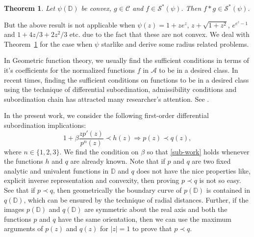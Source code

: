 \documentclass[12pt, reqno]{amsart}
\numberwithin{equation}{section}
\theoremstyle{plain}
\newtheorem{theorem}{Theorem}[section]
\theoremstyle{definition}
\theoremstyle{remark}
\begin{document}
\begin{theorem}\cite{minda94}\label{c1}
	Let $\psi(\mathbb{D})$ be convex, $g\in \mathcal{C}$ and $f\in\mathcal{S}^*(\psi)$. Then	$f*g\in \mathcal{S}^*(\psi).$
\end{theorem}
But the above result is not applicable when $\psi(z)=1+ze^z$, $z+\sqrt{1+z^2}$, $e^{e^z-1}$ and $1+4z/3+2z^2/3$ etc. due to the fact that these are not convex. We deal with Theorem~\ref{c1} for the case when $\psi$ starlike and derive some radius related problems.

In Geometric function theory, we usually find the sufficient conditions in terms of it's coefficients for the normalized functions $f$ in $\mathcal{A}$ to be in a desired class.  In recent times, finding the sufficient conditions on functions to be in a desired class using the technique of differential subordination, admissibility conditions and subordination chain has attracted many researcher's attention. See \cite{Banga-2020,goel2020,sub-pg132}. 

In the present work, we consider the following first-order differential subordination implications:
\begin{equation}\label{sub-work}
1+\beta\frac{zp'(z)}{p^{n}(z)}\prec h(z) \Rightarrow p(z)\prec q(z),
\end{equation}
where $n\in\{1,2,3\}$. We find the condition on $\beta$ so that \eqref{sub-work} holds whenever the functions $h$ and $q$ are already known. Note that if $p$ and $q$ are two fixed analytic and univalent functions in $\mathbb{D}$ and $q$ does not have the nice properties like, explicit inverse representation and convexity, then proving $p\prec q$ is not so easy. See that if $p\prec q $, then geometrically the boundary curve of $p(\mathbb{D})$ is contained in $q(\mathbb{D})$, which can be ensured by the technique of radial distances. Further, if the images $p(\mathbb{D})$ and $q(\mathbb{D})$ are symmetric about the real axis  and both the functions $p$ and $q$ have the same orientation, then we can use the maximum arguments of $p(z)$ and $q(z)$ for $|z|=1$ to prove that $p\prec q$.
\end{document}
